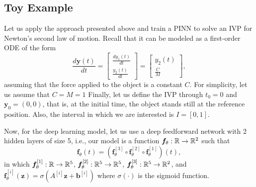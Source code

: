 \subsection*{Toy Example}

Let us apply the approach presented above and train a \gls{PINN} to solve an \gls{IVP} for Newton's second law of motion.
Recall that it can be modeled as a first-order \gls{ODE} of the form
\[
    \frac{d \bm{y}(t)}{dt} = \begin{bmatrix} \frac{d y_1(t)}{dt} \\ \frac{y_2(t)}{dt} \end{bmatrix} = \begin{bmatrix} y_2(t) \\ \frac{C}{M} \end{bmatrix} 
,\]
assuming that the force applied to the object is a constant $C$.
For simplicity, let us assume that $C=M=1$
Finally, let us define the \gls{IVP} through $t_0=0$ and $\bm{y}_0=\left( 0,0 \right) $, that is, at the initial time, the object stands still at the reference position.
Also, the interval in which we are interested is $I=\left[ 0,1 \right] $.

Now, for the deep learning model, let us use a deep feedforward network with 2 hidden layers of size 5, i.e., our model is a function $\bm{f}_\theta:\mathbb{R}\to \mathbb{R}^2$ such that
\[
    \bm{f}_\theta(t) = \left(  \bm{f}_\theta^{[3]} \circ \bm{f}_\theta^{[2]} \circ \bm{f}_\theta^{[1]} \right) \left( t \right) 
,\] in which $\bm{f}_\theta^{[1]}:\mathbb{R}\to \mathbb{R}^{5}$, $\bm{f}_\theta^{[2]}:\mathbb{R}^5\to \mathbb{R}^5$, $\bm{f}_\theta^{[3]}:\mathbb{R}^5\to \mathbb{R}^2$, and $\bm{f}_\theta^{[i]}\left( \bm{z} \right) =\sigma\left( A^{[i]}\bm{z} + \bm{b}^{[i]} \right) $ where $\sigma(\cdot)$ is the sigmoid function.

